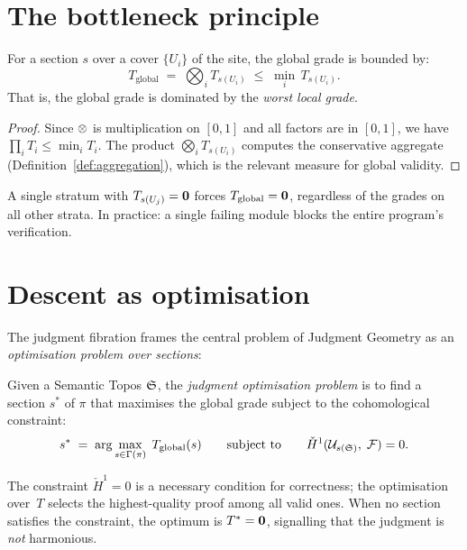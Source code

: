 \section{The bottleneck principle}
\label{sec:bottleneck-principle}

\begin{theorem}
\label{thm:bottleneck-p2}
For a section $s$ over a cover $\{U_i\}$ of the site, the global grade
is bounded by:
\[
  T_{\mathrm{global}}
  \;=\;
  \bigotimes_{i} T_{s(U_i)}
  \;\leq\;
  \min_i \, T_{s(U_i)}.
\]
That is, the global grade is dominated by the \emph{worst local grade}.
\end{theorem}

\begin{proof}
Since $\otimes$ is multiplication on $[0,1]$ and all factors are in
$[0,1]$, we have $\prod_i T_i \leq \min_i T_i$.  The product
$\bigotimes_i T_{s(U_i)}$ computes the conservative aggregate
(Definition~\ref{def:aggregation}), which is the relevant measure for
global validity.
\end{proof}

\begin{corollary}
\label{cor:bottleneck}
A single stratum with $T_{s(U_j)} = \mathbf{0}$ forces
$T_{\mathrm{global}} = \mathbf{0}$, regardless of the grades on all other
strata.  In practice: a single failing module blocks the entire
program's verification.
\end{corollary}

\section{Descent as optimisation}
\label{sec:descent-optimisation}

The judgment fibration frames the central problem of Judgment Geometry
as an \emph{optimisation problem over sections}:

\begin{definition}
\label{def:judgment-opt}
Given a Semantic Topos $\mathfrak{S}$, the \emph{judgment optimisation
problem} is to find a section $s^*$ of $\pi$ that maximises the
global grade subject to the cohomological constraint:
\[
  s^* \;=\;
  \arg\max_{s \in \Gamma(\pi)}\;
  T_{\mathrm{global}}(s)
  \qquad\text{subject to}\qquad
  \check{H}^1(\mathcal{U}_{s(\mathfrak{S})},\; \mathcal{F}) = 0.
\]
\end{definition}

\begin{remark}
The constraint $\check{H}^1 = 0$ is a necessary condition for
correctness; the optimisation over~$T$ selects the highest-quality
proof among all valid ones.  When no section satisfies the constraint,
the optimum is $T^* = \mathbf{0}$, signalling that the judgment is
\emph{not} harmonious.
\end{remark}

